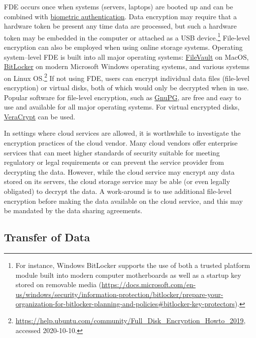 FDE occurs once when systems (servers, laptops) are booted up and can be combined with \protect\hyperlink{biometric-authentication}{biometric authentication}. Data encryption may require that a hardware token be present any time data are processed, but such a hardware token may be embedded in the computer or attached as a USB device.\footnote{For instance, Windows BitLocker supports the use of both a trusted platform module built into modern computer motherboards as well as a startup key stored on removable media (\url{https://docs.microsoft.com/en-us/windows/security/information-protection/bitlocker/prepare-your-organization-for-bitlocker-planning-and-policies\#bitlocker-key-protectors}).} File-level encryption can also be employed when using online storage systems. Operating system--level FDE is built into all major operating systems: \href{https://support.apple.com/en-us/HT204837}{FileVault} on MacOS, \href{https://docs.microsoft.com/en-us/windows/security/information-protection/bitlocker/bitlocker-overview}{BitLocker} on modern Microsoft Windows operating systems, and various systems on Linux OS.\footnote{\url{https://help.ubuntu.com/community/Full_Disk_Encryption_Howto_2019}, accessed 2020-10-10.} If not using FDE, users can encrypt individual data files (file-level encryption) or virtual disks, both of which would only be decrypted when in use. Popular software for file-level encryption, such as \href{https://gnupg.org/index.html}{GnuPG}, are free and easy to use and available for all major operating systems. For virtual encrypted disks, \href{https://www.veracrypt.fr/en/Home.html}{VeraCrypt} can be used.

In settings where cloud services are allowed, it is worthwhile to investigate the encryption practices of the cloud vendor. Many cloud vendors offer enterprise services that can meet higher standards of security suitable for meeting regulatory or legal requirements or can prevent the service provider from decrypting the data. However, while the cloud service may encrypt any data stored on its servers, the cloud storage service may be able (or even legally obligated) to decrypt the data. A work-around is to use additional file-level encryption before making the data available on the cloud service, and this may be mandated by the data sharing agreements.

\hypertarget{transfer-of-data}{%
\subsection{Transfer of Data}\label{transfer-of-data}}

